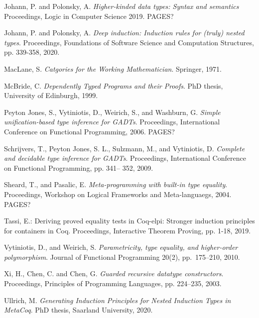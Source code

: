 \documentclass[9pt]{entcs}
\begin{document}
\begin{thebibliography}{10}
 Johann, P. and Polonsky, A. {\em Higher-kinded data
  types: Syntax and semantics} Proceedings, Logic in Computer Science
  2019. {\color{red} PAGES?}

 Johann, P. and Polonsky, A. {\em Deep induction:
  Induction rules for (truly) nested types}.  Proceedings, Foundations
  of Software Science and Computation Structures, pp. 339-358, 2020.

 MacLane, S. {\em Catgories for the Working
  Mathematician}. Springer, 1971.

 McBride, C. {\em Dependently Typed Programs and their
  Proofs}. PhD thesis, University of Edinburgh, 1999.




 Peyton Jones, S., Vytiniotis, D., Weirich, S., and
  Washburn, G. {\em Simple unification-based type inference for
    GADTs}. Proceedings, International Conference on Functional
  Programming, 2006. {\color{red} PAGES?}


 Schrijvers, T., Peyton Jones, S. L., Sulzmann, M., and
  Vytiniotis, D. {\em Complete and decidable type inference for
    GADTs}. Proceedings, International Conference on Functional
  Programming, pp. 341– 352, 2009.

 Sheard, T., and Pasalic, E. {\em Meta-programming with
  built-in type equality}. Proceedings, Workshop on Logical Frameworks
  and Meta-languaegs, 2004. {\color{red} PAGES?}

 Tassi, E.: Deriving proved equality tests in Coq-elpi:
  Stronger induction principles for containers in Coq. Proceedings,
  Interactive Theorem Proving, pp. 1-18, 2019.
  
 Vytiniotis, D., and Weirich, S.  {\em Parametricity,
  type equality, and higher-order polymorphism}.  Journal of
  Functional Programming 20(2), pp.~175--210, 2010.

 Xi, H., Chen, C. and Chen, G. {\em Guarded recursive
  datatype constructors}. Proceedings, Principles of Programming
  Languages, pp. 224–235, 2003.

 Ullrich, M. {\em Generating Induction Principles for
Nested Induction Types in MetaCoq}. PhD thesis, Saarland University,
  2020.  
  
\end{thebibliography}
\end{document}
